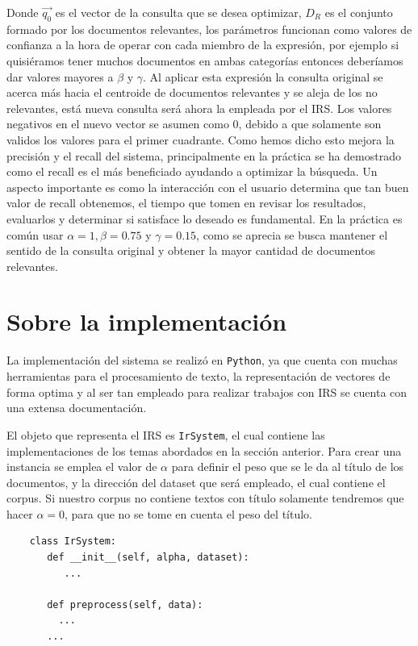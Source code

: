 \documentclass[runningheads,a4paper]{llncs}
\begin{document}
Donde $\overrightarrow{q_0}$ es el vector de la consulta que se desea optimizar, $D_R$ es el conjunto formado por los documentos relevantes, los parámetros funcionan como valores de confianza a la hora de operar con cada miembro de la expresión, por ejemplo si quisiéramos tener muchos documentos en ambas categorías entonces deberíamos dar valores mayores a $\beta$ y $\gamma$. Al aplicar esta expresión la consulta original se acerca más hacia el centroide de documentos relevantes y se aleja de los no relevantes, está nueva consulta será ahora la empleada por el IRS. Los valores negativos en el nuevo vector se asumen como 0, debido a que solamente son validos los valores para el primer cuadrante. Como hemos dicho esto mejora la precisión y el recall del sistema, principalmente en la práctica se ha demostrado como el recall es el más beneficiado ayudando a optimizar la búsqueda. Un aspecto importante es como la interacción con el usuario determina que tan buen valor de recall obtenemos, el tiempo que tomen en revisar los resultados, evaluarlos y determinar si satisface lo deseado es fundamental. En la práctica es común usar $\alpha = 1, \beta = 0.75$ y $\gamma = 0.15$, como se aprecia se busca mantener el sentido de la consulta original y obtener la mayor cantidad de documentos relevantes.

\section{Sobre la implementación} %

La implementación del sistema se realizó en \verb*|Python|, ya que cuenta con muchas herramientas para el procesamiento de texto, la representación de vectores de forma optima y al ser tan empleado para realizar trabajos con IRS se cuenta con una extensa documentación.

El objeto que representa el IRS es \verb*|IrSystem|, el cual contiene las implementaciones de los temas abordados en la sección anterior. Para crear una instancia se emplea el valor de $\alpha$ para definir el peso que se le da al título de los documentos, y la dirección del dataset que será empleado, el cual contiene el corpus. Si nuestro corpus no contiene textos con título solamente tendremos que hacer $\alpha = 0$, para que no se tome en cuenta el peso del título.

\noindent
%
\begin{verbatim}
	class IrSystem:	   
	   def __init__(self, alpha, dataset):
	      ...
	      
	   def preprocess(self, data):
	     ...	     
	   ...
\end{verbatim}
%
\noindent
\end{document}
